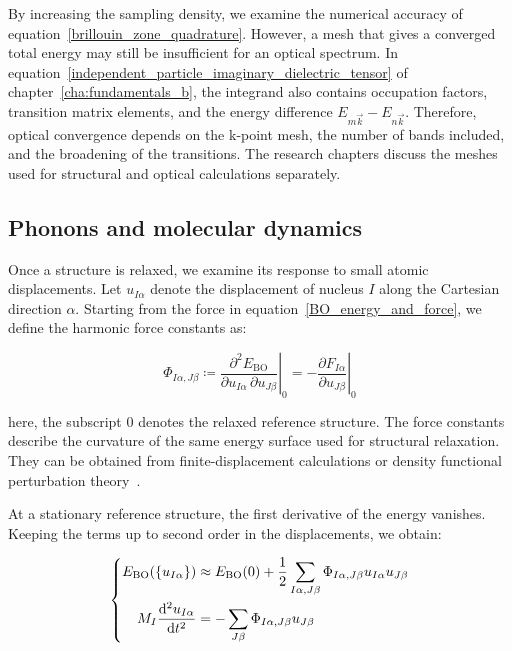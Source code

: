 By increasing the sampling density, we examine the numerical accuracy of equation~\eqref{brillouin_zone_quadrature}.
However, a mesh that gives a converged total energy may still be insufficient for an optical spectrum.
In equation~\eqref{independent_particle_imaginary_dielectric_tensor} of chapter~\ref{cha:fundamentals_b},
the integrand also contains occupation factors, transition matrix elements,
and the energy difference $E_{m\vec{k}}-E_{n\vec{k}}$.
Therefore, optical convergence depends on the k-point mesh, the number of bands included, and the broadening of the transitions.
The research chapters discuss the meshes used for structural and optical calculations separately.

\FloatBarrier
\subsection{Phonons and molecular dynamics}
\label{subsec:method_stability}

Once a structure is relaxed, we examine its response to small atomic displacements.
Let $u_{I\alpha}$ denote the displacement of nucleus $I$ along the Cartesian direction $\alpha$.
Starting from the force in equation~\eqref{BO_energy_and_force},
we define the harmonic force constants as:

\begin{equation}
    \Phi_{I\alpha,J\beta}
    \coloneqq
    \left.\frac{\partial^2E_\mathrm{BO}}
    {\partial u_{I\alpha}\,\partial u_{J\beta}}\right|_0
    =
    -\left.\frac{\partial F_{I\alpha}}{\partial u_{J\beta}}\right|_0
\label{harmonic_force_constants_method}
\end{equation}

here, the subscript $0$ denotes the relaxed reference structure.
The force constants describe the curvature of the same energy surface used for structural relaxation.
They can be obtained from finite-displacement calculations or density functional perturbation theory~\cite{baroni2001phonons,togo2015first}.

At a stationary reference structure, the first derivative of the energy vanishes.
Keeping the terms up to second order in the displacements, we obtain:

\begin{equation}
\left\{\begin{aligned}
    E_\mathrm{BO}(\{u_{I\alpha}\})
    &\approx E_\mathrm{BO}(0)
    +\frac{1}{2}\sum_{I\alpha,J\beta}
    \Phi_{I\alpha,J\beta}u_{I\alpha}u_{J\beta} \\
    M_I\frac{\mathrm{d}^2u_{I\alpha}}{\mathrm{d} t^2}
    &=-\sum_{J\beta}\Phi_{I\alpha,J\beta}u_{J\beta}
\end{aligned}\right.
\label{harmonic_energy_and_motion_method}
\end{equation}

